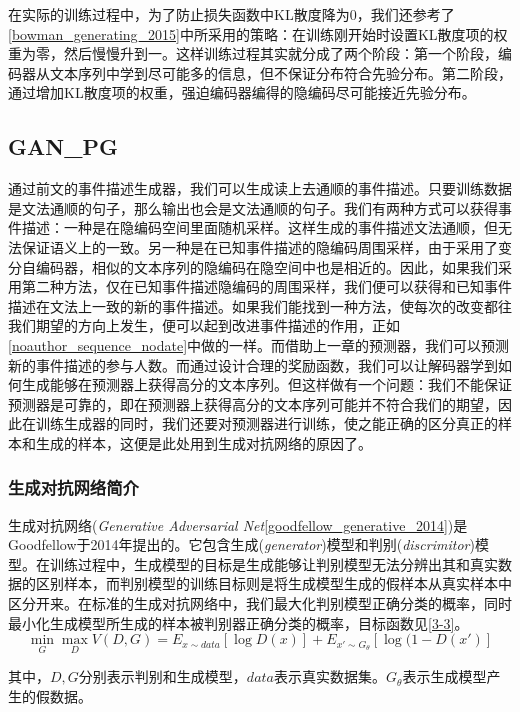 \documentclass[]{template}
\begin{document}
在实际的训练过程中，为了防止损失函数中KL散度降为0，我们还参考了\ref{bowman_generating_2015}中所采用的策略：在训练刚开始时设置KL散度项的权重为零，然后慢慢升到一。这样训练过程其实就分成了两个阶段：第一个阶段，编码器从文本序列中学到尽可能多的信息，但不保证分布符合先验分布。第二阶段，通过增加KL散度项的权重，强迫编码器编得的隐编码尽可能接近先验分布。

\subsection{GAN\_PG}
通过前文的事件描述生成器，我们可以生成读上去通顺的事件描述。只要训练数据是文法通顺的句子，那么输出也会是文法通顺的句子。我们有两种方式可以获得事件描述：一种是在隐编码空间里面随机采样。这样生成的事件描述文法通顺，但无法保证语义上的一致。另一种是在已知事件描述的隐编码周围采样，由于采用了变分自编码器，相似的文本序列的隐编码在隐空间中也是相近的。因此，如果我们采用第二种方法，仅在已知事件描述隐编码的周围采样，我们便可以获得和已知事件描述在文法上一致的新的事件描述。如果我们能找到一种方法，使每次的改变都往我们期望的方向上发生，便可以起到改进事件描述的作用，正如\ref{noauthor_sequence_nodate}中做的一样。而借助上一章的预测器，我们可以预测新的事件描述的参与人数。而通过设计合理的奖励函数，我们可以让解码器学到如何生成能够在预测器上获得高分的文本序列。但这样做有一个问题：我们不能保证预测器是可靠的，即在预测器上获得高分的文本序列可能并不符合我们的期望，因此在训练生成器的同时，我们还要对预测器进行训练，使之能正确的区分真正的样本和生成的样本，这便是此处用到生成对抗网络的原因了。
\subsubsection{生成对抗网络简介}
生成对抗网络(\textit{Generative Adversarial Net}\ref{goodfellow_generative_2014})是Goodfellow于2014年提出的。它包含生成(\textit{generator})模型和判别(\textit{discrimitor})模型。在训练过程中，生成模型的目标是生成能够让判别模型无法分辨出其和真实数据的区别样本，而判别模型的训练目标则是将生成模型生成的假样本从真实样本中区分开来。在标准的生成对抗网络中，我们最大化判别模型正确分类的概率，同时最小化生成模型所生成的样本被判别器正确分类的概率，目标函数见\ref{3-3}。
\begin{equation}\label{3-3}
    \mathop{min}_G \mathop{max}_D V(D,G)=E_{x\sim data}[\log D(x)]+E_{x'\sim G_\theta}[\log(1-D(x')]
\end{equation}

其中，$D,G$分别表示判别和生成模型，$data$表示真实数据集。$G_\theta$表示生成模型产生的假数据。
\end{document}
